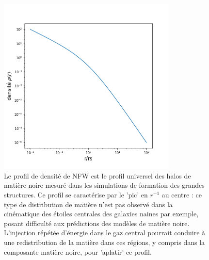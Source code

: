 \begin{figure}[htbp]
	\centering
		\includegraphics[height=9cm]{figs/nfw.png}
		\caption[Le profil de densité NFW]{Le profil de densité de NFW est le profil universel des halos de matière noire mesuré dans les simulations de formation des grandes structures. Ce profil se caractérise par le 'pic' en $r^{-1}$ au centre : ce type de distribution de matière n'est pas observé dans la cinématique des étoiles centrales des galaxies naines par exemple, posant difficulté aux prédictions des modèles de matière noire. L'injection répétée d'énergie dans le gaz central pourrait conduire à une redistribution de la matière dans ces régions, y compris dans la composante matière noire, pour 'aplatir' ce profil.}
	\label{f:nfw}
\end{figure}

